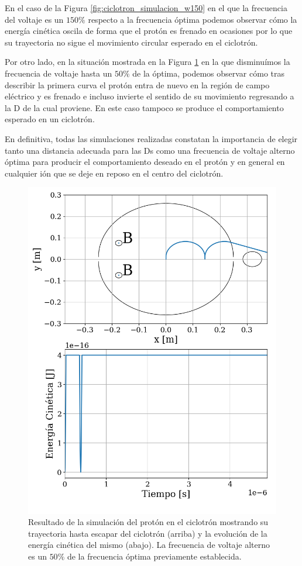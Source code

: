 \documentclass[journal]{IEEEtran}
\begin{document}
En el caso de la Figura \ref{fig:ciclotron_simulacion_w150} en el que la frecuencia del voltaje es un $150\%$ respecto a la frecuencia óptima podemos observar cómo la energía cinética oscila de forma que el protón es frenado en ocasiones por lo que su trayectoria no sigue el movimiento circular esperado en el ciclotrón.

Por otro lado, en la situación mostrada en la Figura \ref{fig:ciclotron_simulacion_w50} en la que disminuímos la frecuencia de voltaje hasta un $50\%$ de la óptima, podemos observar cómo tras describir la primera curva el protón entra de nuevo en la región de campo eléctrico y es frenado e incluso invierte el sentido de su movimiento regresando a la D de la cual proviene. En este caso tampoco se produce el comportamiento esperado en un ciclotrón.

En definitiva, todas las simulaciones realizadas constatan la importancia de elegir tanto una distancia adecuada para las Ds como una frecuencia de voltaje alterno óptima para producir el comportamiento deseado en el protón y en general en cualquier ión que se deje en reposo en el centro del ciclotrón.

\begin{figure}[!htb]
    \centering
    \includegraphics[width=0.9\linewidth]{ciclotron_simulacion_w50.png}
    \caption{Resultado de la simulación del protón en el ciclotrón mostrando su trayectoria hasta escapar del ciclotrón (arriba) y la evolución de la energía cinética del mismo (abajo). La frecuencia de voltaje alterno es un $50\%$ de la frecuencia óptima previamente establecida.}
    \label{fig:ciclotron_simulacion_w50}
\end{figure}
\end{document}
